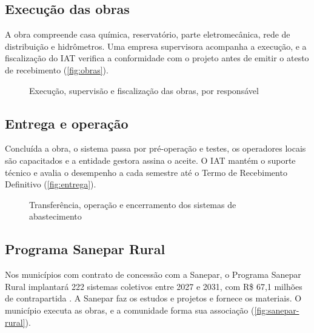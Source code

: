 \subsection{Execução das obras}
\label{subsec:obras}

A obra compreende casa química, reservatório, parte eletromecânica, rede de
distribuição e hidrômetros. Uma empresa supervisora acompanha a execução, e a
fiscalização do IAT verifica a conformidade com o projeto antes de emitir o
atesto de recebimento (\autoref{fig:obras}).

\begin{figure}[htbp]
  \centering
  \caption{Execução, supervisão e fiscalização das obras, por responsável}
  \label{fig:obras}
\end{figure}


\subsection{Entrega e operação}
\label{subsec:entrega}

Concluída a obra, o sistema passa por pré-operação e testes, os operadores
locais são capacitados e a entidade gestora assina o aceite. O IAT mantém o
suporte técnico e avalia o desempenho a cada semestre até o Termo de
Recebimento Definitivo (\autoref{fig:entrega}).

\begin{figure}[htbp]
  \centering
  \caption{Transferência, operação e encerramento dos sistemas de abastecimento}
  \label{fig:entrega}
\end{figure}

\subsection{Programa Sanepar Rural}
\label{subsec:sanepar-rural}

Nos municípios com contrato de concessão com a Sanepar, o Programa Sanepar
Rural implantará 222 sistemas coletivos entre 2027 e 2031, com R\$ 67,1
milhões de contrapartida \cite{custo2026}. A Sanepar faz os estudos e
projetos e fornece os materiais. O município executa as obras, e a comunidade
forma sua associação (\autoref{fig:sanepar-rural}).

